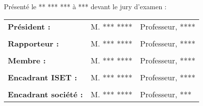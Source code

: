 \begin{titlepage}
\begin{center}
        Présenté le ** *** *** à *** devant le jury d'examen :\\
    \end{center}
    \begin{center}
        \begin{tabular}{lll}
            \textbf{Président :}               & \textsc{M. *** ****} & Professeur, \textsc{****}
            \tabularnewline
            \tabularnewline
            \textbf{Rapporteur :}              & \textsc{M. *** ****} & Professeur, \textsc{****}
            \tabularnewline
            \tabularnewline
            \textbf{Membre :}                  & \textsc{M. *** ****} & Professeur, \textsc{****}
            \tabularnewline
            \tabularnewline
            \textbf{Encadrant \textsc{ISET} :} & \textsc{M. *** ****} & Professeur, \textsc{****}
            \tabularnewline
            \tabularnewline
            \textbf{Encadrant société :}       & \textsc{M. *** ****} & Professeur, \textsc{***}
        \end{tabular}
    \end{center}
    \sloppy
\end{titlepage}

